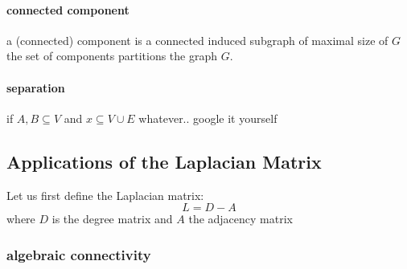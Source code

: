 \documentclass[a4paper]{article}
\theoremstyle{definition}
\theoremstyle{remark}
\begin{document}
\paragraph{connected component}
\label{par:component}

a (connected) component is a connected induced subgraph of maximal size of $G$\\
the set of components partitions the graph $G$.
\paragraph{separation}
\label{par:separation}

if $A,B\subseteq V$ and $x\subseteq V\cup E$
whatever.. google it yourself

\subsection{Applications of the Laplacian Matrix}
\label{ssub:anwendung_von_laplace_matrix_oder_so}
Let us first define the Laplacian matrix:
 \begin{equation}
   L=D-A
 \end{equation}
where $D$ is the degree matrix and $A$ the adjacency matrix
 \subsubsection{algebraic connectivity}
 \label{ssub:algebraic_connectivity}
 
\end{document}
